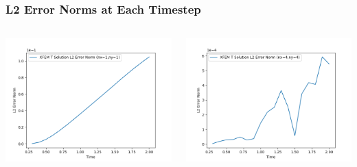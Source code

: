 \documentclass[]{beamer}
\begin{document}
\begin{frame}[t]\frametitle{L2 Error Norms at Each Timestep}
  	\begin{columns}
			\begin{center}
			\includegraphics[scale=0.4]{figures/2D_xy_h1m/2D_xy_homog1mat_nx1ny1_L2_Errs}
			\end{center}
			\begin{center}
			\includegraphics[scale=0.4]{figures/2D_xy_h1m/2D_xy_homog1mat_nx4ny4_L2_Errs}
			\end{center}
	\end{columns}
\end{frame}
\end{document}
